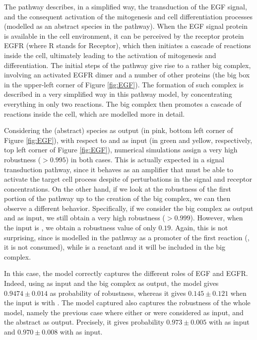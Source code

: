 The pathway describes, in a simplified way, the transduction of the EGF signal, and the consequent activation of the mitogenesis and cell differentiation processes (modelled as an abstract species in the pathway). When the EGF signal protein is available in the cell environment, it can be perceived by the receptor protein EGFR (where R stands for Receptor), which then initiates a cascade of reactions inside the cell, ultimately leading to the activation of mitogenesis and differentiation. The initial steps of the pathway give rise to a rather big complex, involving an activated EGFR dimer and a number of other proteins (the big box in the upper-left corner of Figure \ref{fig:EGF}). The formation of such complex is described in a very simplified way in this pathway model, by concentrating everything in only two reactions. The big complex then promotes a cascade of reactions inside the cell, which are modelled more in detail.

Considering the   (abstract) species as output (in pink, bottom left corner of Figure \ref{fig:EGF}), with respect to  and  as input (in green and yellow, respectively, top left corner of Figure \ref{fig:EGF}), numerical simulations assign a very high robustness ($>0.995$) in both cases. This is actually expected in a signal transduction pathway, since it behaves as an amplifier that must be able to activate the target cell process despite of perturbations in the signal and receptor concentrations. On the other hand, if we look at the robustness of the first portion of the pathway up to the creation of the big complex, we can then observe a different behavior. Specifically, if we consider the big complex as output and  as input, we still obtain a very high robustness ($>0.999$). However, when the input is , we obtain a robustness value of only $0.19$. Again, this is not surprising, since  is modelled in the pathway as a promoter of the first reaction (\ie, it is not consumed), while  is a reactant and it will be included in the big complex.

In this case, the model correctly captures the different roles of EGF and EGFR. Indeed, using  as input and the big complex as output, the model gives $0.9474 \pm 0.014$ as probability of robustness, whereas it gives $0.145 \pm 0.121$ when the input is with . The model captured also captures the robustness of the whole model, namely the previous case where either  or  were considered as input, and the abstract   as output. Precisely, it gives probability $0.973 \pm 0.005$ with  as input and $0.970 \pm 0.008$ with  as input.

